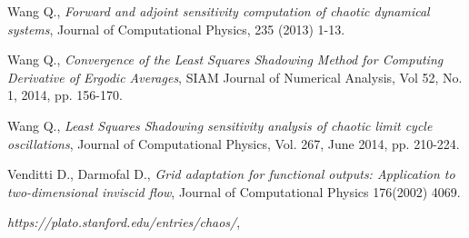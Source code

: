 \documentclass[12pt]{article}
\begin{document}
\begin{thebibliography}{99}
 Wang Q.,
\emph{Forward and adjoint sensitivity computation of chaotic dynamical systems},
Journal of Computational Physics, 235 (2013) 1-13.

 Wang Q.,
\emph{Convergence of the Least Squares Shadowing Method for Computing Derivative of Ergodic Averages},
SIAM Journal of Numerical Analysis, Vol 52, No. 1, 2014, pp. 156-170.  

 Wang Q., 
\emph{Least Squares Shadowing sensitivity analysis of chaotic limit cycle oscillations},
Journal of Computational Physics, Vol. 267, June 2014, pp. 210-224.  

 Venditti D., Darmofal D.,
\emph{Grid adaptation for functional outputs: Application to two-dimensional inviscid flow},
Journal of Computational Physics 176(2002) 4069.

\emph{https://plato.stanford.edu/entries/chaos/},
\end{thebibliography} 
\end{document}
